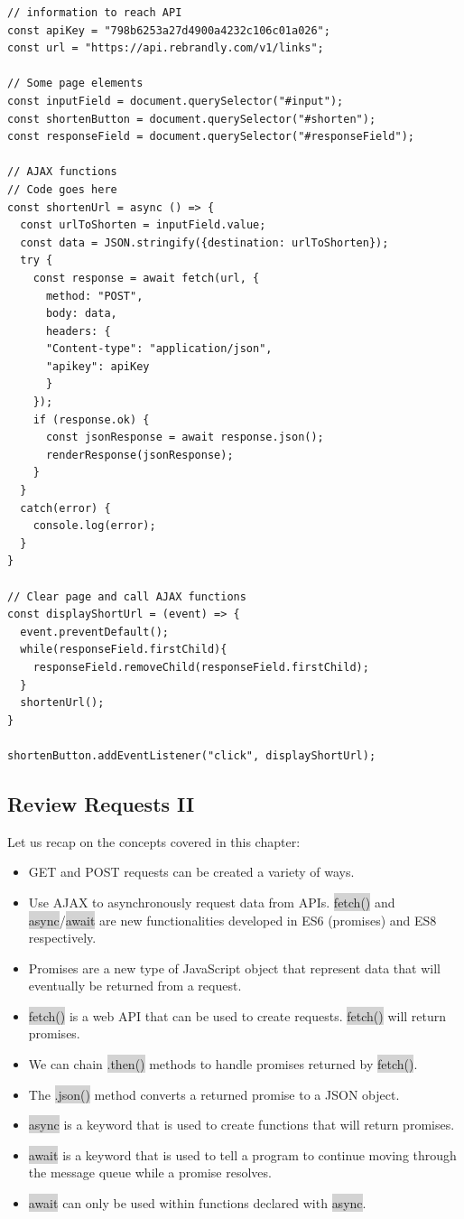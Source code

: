 \documentclass[11pt]{article}
\begin{document}
\begin{lstlisting}
// information to reach API
const apiKey = "798b6253a27d4900a4232c106c01a026";
const url = "https://api.rebrandly.com/v1/links";

// Some page elements
const inputField = document.querySelector("#input");
const shortenButton = document.querySelector("#shorten");
const responseField = document.querySelector("#responseField");

// AJAX functions
// Code goes here
const shortenUrl = async () => {
  const urlToShorten = inputField.value; 
  const data = JSON.stringify({destination: urlToShorten});
  try {
    const response = await fetch(url, {
      method: "POST", 
      body: data, 
      headers: {
      "Content-type": "application/json",
      "apikey": apiKey
      }
    }); 
    if (response.ok) {
      const jsonResponse = await response.json(); 
      renderResponse(jsonResponse);
    }
  }
  catch(error) {
    console.log(error);
  }
}

// Clear page and call AJAX functions
const displayShortUrl = (event) => {
  event.preventDefault();
  while(responseField.firstChild){
    responseField.removeChild(responseField.firstChild);
  }
  shortenUrl();
}

shortenButton.addEventListener("click", displayShortUrl);
\end{lstlisting}

\subsection{Review Requests II}
Let us recap on the concepts covered in this chapter:
\begin{itemize}[leftmargin = *]
\item GET and POST requests can be created a variety of ways.
\item Use AJAX to asynchronously request data from APIs. \colorbox{lightgray}{fetch()} and \colorbox{lightgray}{async}/\colorbox{lightgray}{await} are new functionalities developed in ES6 (promises) and ES8 respectively.
\item Promises are a new type of JavaScript object that represent data that will eventually be returned from a request.
\item \colorbox{lightgray}{fetch()} is a web API that can be used to create requests. \colorbox{lightgray}{fetch()} will return promises.
\item We can chain \colorbox{lightgray}{.then()} methods to handle promises returned by \colorbox{lightgray}{fetch()}.
\item The \colorbox{lightgray}{.json()} method converts a returned promise to a JSON object.
\item \colorbox{lightgray}{async} is a keyword that is used to create functions that will return promises.
\item \colorbox{lightgray}{await} is a keyword that is used to tell a program to continue moving through the message queue while a promise resolves.
\item \colorbox{lightgray}{await} can only be used within functions declared with \colorbox{lightgray}{async}.
\end{itemize}
\end{document}
